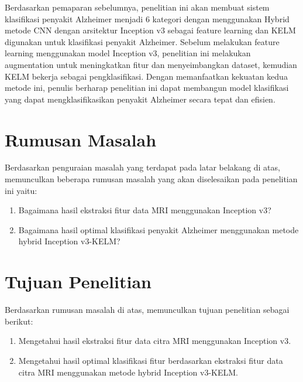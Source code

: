     Berdasarkan pemaparan sebelumnya, penelitian ini akan membuat sistem klasifikasi penyakit Alzheimer menjadi 6 kategori dengan menggunakan Hybrid metode CNN dengan arsitektur Inception v3 sebagai feature learning dan KELM digunakan untuk klasifikasi penyakit Alzheimer. Sebelum melakukan feature learning menggunakan model Inception v3, penelitian ini melakukan augmentation untuk meningkatkan fitur dan menyeimbangkan dataset, kemudian KELM bekerja sebagai pengklasifikasi. Dengan memanfaatkan kekuatan kedua metode ini, penulis berharap penelitian ini dapat membangun model klasifikasi yang dapat mengklasifikasikan penyakit Alzheimer secara tepat dan efisien.

    \section{Rumusan Masalah}
    Berdasarkan penguraian masalah yang terdapat pada latar belakang di atas, memunculkan beberapa rumusan masalah yang akan diselesaikan pada penelitian ini yaitu:
    \begin{enumerate}
        \item Bagaimana hasil ekstraksi fitur data MRI menggunakan Inception v3?
        \item Bagaimana hasil optimal klasifikasi penyakit Alzheimer menggunakan metode hybrid Inception v3-KELM?
    \end{enumerate}

    \section{Tujuan Penelitian}
    Berdasarkan rumusan masalah di atas, memunculkan tujuan penelitian sebagai berikut:
    \begin{enumerate}
        \item Mengetahui hasil ekstraksi fitur data citra MRI menggunakan Inception v3.
        \item Mengetahui hasil optimal klasifikasi fitur berdasarkan ekstraksi fitur data citra MRI menggunakan metode hybrid Inception v3-KELM.
    \end{enumerate}

